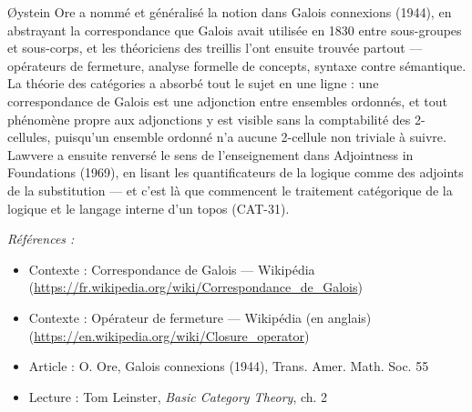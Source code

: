 \documentclass[11pt]{article}
\newenvironment{refs}{\par\small\noindent\emph{Références :}\begin{itemize}\setlength\itemsep{0pt}}{\end{itemize}\normalsize}
\begin{document}
\noindent Øystein Ore a nommé et généralisé la notion dans \og{} Galois connexions \fg{} (1944),
en abstrayant la correspondance que Galois avait utilisée en 1830 entre sous-groupes et
sous-corps, et les théoriciens des treillis l'ont ensuite trouvée partout --- opérateurs de
fermeture, analyse formelle de concepts, syntaxe contre sémantique. La théorie des catégories a
absorbé tout le sujet en une ligne : une correspondance de Galois est une adjonction entre
ensembles ordonnés, et tout phénomène propre aux adjonctions y est visible sans la comptabilité
des 2-cellules, puisqu'un ensemble ordonné n'a aucune 2-cellule non triviale à suivre. Lawvere a
ensuite renversé le sens de l'enseignement dans \og{} Adjointness in Foundations \fg{} (1969), en lisant
les quantificateurs de la logique comme des adjoints de la substitution --- et c'est là que
commencent le traitement catégorique de la logique et le langage interne d'un topos (CAT-31).

\begin{refs}
\item Contexte : Correspondance de Galois --- Wikipédia (\url{https://fr.wikipedia.org/wiki/Correspondance_de_Galois})
\item Contexte : Opérateur de fermeture --- Wikipédia (en anglais) (\url{https://en.wikipedia.org/wiki/Closure_operator})
\item Article : O. Ore, \og{} Galois connexions \fg{} (1944), Trans. Amer. Math. Soc. 55
\item Lecture : Tom Leinster, \textit{Basic Category Theory}, ch. 2
\end{refs}

\bigskip
\end{document}

